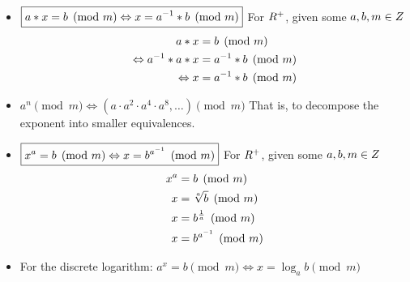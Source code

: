 \begin{itemize}
    \item $\boxed{a \ast x = b \pmod{m} \Leftrightarrow x = {a}^{-1} \ast b \pmod{m}}$
        \subitem For $\relax{R}^{+}$, given some $a, b, m \in \relax{Z}$
        \begin{align}
            a \ast x                                  &= b \pmod{m} \\
            \Leftrightarrow {a}^{-1} \ast a \ast x &= {a}^{-1} \ast b \pmod{m} \\
            \Leftrightarrow x                         &= {a}^{-1} \ast b \pmod{m}
        \end{align}
    \item $\boxed{a^n \pmod{m} \Leftrightarrow (a \cdot a^2 \cdot a^4 \cdot a^8, \dots) \pmod{m}}$
        \subitem That is, to decompose the exponent into smaller equivalences.
    \item $\boxed{x^a = b \pmod{m} \Leftrightarrow x = b^{{a}^{-1}} \pmod{m}}$
        \subitem For $\relax{R}^{+}$, given some $a, b, m \in \relax{Z}$
        \begin{align}
            x^a &= b \pmod{m} \\
            x   &= \sqrt[a]{b} \pmod{m} \\
            x   &= b^{\frac{1}{a}} \pmod{m} \\
            x   &= b^{{a}^{-1}} \pmod{m}
        \end{align}
    \item For the discrete logarithm: $\boxed{a^x = b \pmod{m} \Leftrightarrow x = \log_a{b} \pmod{m}}$
\end{itemize}

